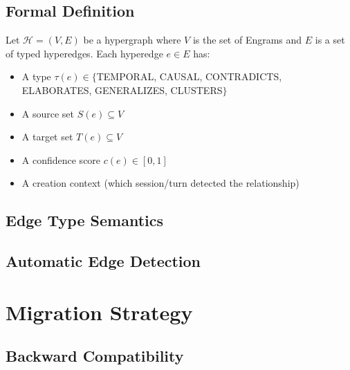 \documentclass[man,12pt,floatsintext]{apa7}
\begin{document}
\subsection{Formal Definition}

Let $\mathcal{H} = (V, E)$ be a hypergraph where $V$ is the set of Engrams and $E$ is a
set of typed hyperedges. Each hyperedge $e \in E$ has:

\begin{itemize}
  \item A type $\tau(e) \in \{$TEMPORAL, CAUSAL, CONTRADICTS, ELABORATES,
        GENERALIZES, CLUSTERS$\}$
  \item A source set $S(e) \subseteq V$
  \item A target set $T(e) \subseteq V$
  \item A confidence score $c(e) \in [0, 1]$
  \item A creation context (which session/turn detected the relationship)
\end{itemize}

\subsection{Edge Type Semantics}


\subsection{Automatic Edge Detection}


\section{Migration Strategy}

\subsection{Backward Compatibility}
\end{document}
